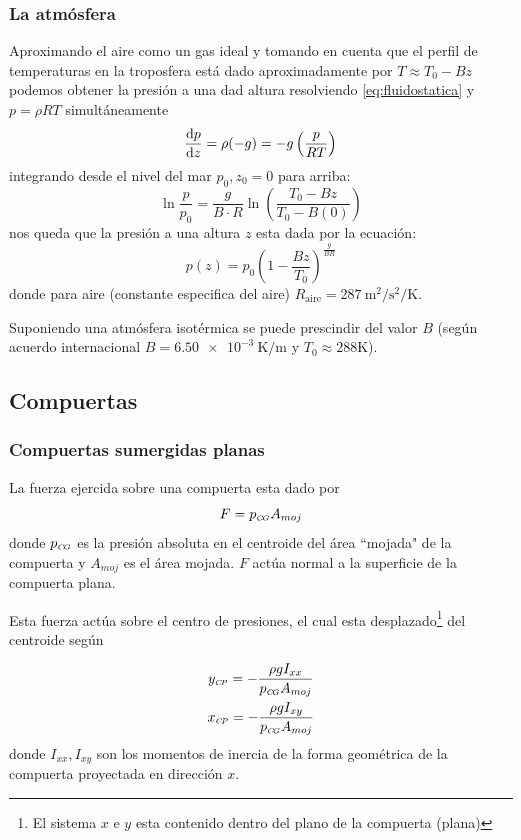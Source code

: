 \subsubsection*{La atmósfera}
Aproximando el aire como un gas ideal y tomando en cuenta que el perfil de temperaturas en la troposfera está dado aproximadamente por $T\approx T_0 -B z$ podemos obtener la presión a una dad altura resolviendo \eqref{eq:fluidostatica} y $p=\rho R T$ simultáneamente
\[
 \frac{\textrm{d} p}{\textrm{d} z}=\rho( -g) =-g\left(\frac{p}{RT}  \right) 
\]
integrando desde el nivel del mar $p_0,z_0=0$ para arriba:
\[
\ln \frac{p}{p_0}= \frac{g}{B\cdot R} \ln\left(\frac{T_0-Bz}{T_0-B(0)}\right) 
\]
nos queda que la presión a una altura $z$ esta dada por la ecuación:
\[
p(z) = p_0 \left( 1-\frac{Bz}{T_0}\right)^{\frac{g}{BR}}
\]
donde para aire (constante especifica del aire) $R_{\textrm{aire}}=\SI{287}{\meter \squared \per \second \squared \per \kelvin}$.

Suponiendo una atmósfera isotérmica se puede prescindir del valor $B$ (según acuerdo internacional $B=\SI{6,50e-3}{\kelvin \per \meter}$ y  $T_0\approx 288 \si{\kelvin}$).

\newcommand{\CP}{{\mbox{\tiny $C\!P$}}}
\newcommand{\CG}{{\mbox{\tiny $C\!G$}}}
\subsection{Compuertas}
\subsubsection*{Compuertas sumergidas planas}
La fuerza ejercida sobre una compuerta esta dado por
\begin{equation}
F=p_{\CG}A_{moj}
\end{equation}
donde $p_{\CG}$ es la presión absoluta en el centroide del área ``mojada"{} de la compuerta y $A_{moj}$ es el área mojada. $F$ actúa normal a la superficie de la compuerta plana.

Esta fuerza actúa sobre el centro de presiones, el cual esta desplazado\footnote{El sistema $x$ e $y$ esta contenido dentro del plano de la compuerta (plana)} del centroide según

\begin{gather}
y_{\CP} = -\frac{\rho g I_{xx}}{p_{\CG}A_{moj}} \\
x_{\CP} = - \frac{\rho g I_{xy}}{p_{\CG}A_{moj}}
\end{gather}
donde $I_{xx},I_{xy}$ son los momentos de inercia de la forma geométrica de la compuerta proyectada en dirección $x$.

